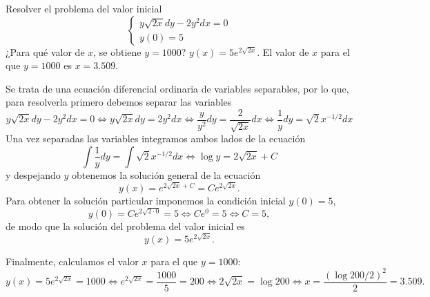 {Resolver el problema del valor inicial
\[
\left\{
  \begin{array}{l}
    y\sqrt{2x}dy-2y^2dx=0\\
    y(0)=5
  \end{array}
\right.
\]
¿Para qué valor de $x$, se obtiene $y=1000$?
}
{$y(x) = 5 e^{2\sqrt{2x}}$. El valor de $x$ para el que $y=1000$ es $x=3.509$.
}
{Se trata de una ecuación diferencial ordinaria de variables separables, por lo que, para resolverla primero debemos separar las variables
\[
y\sqrt{2x}dy-2y^2dx=0 \Leftrightarrow  y\sqrt{2x}dy = 2y^2dx \Leftrightarrow \frac{y}{y^2}dy = \frac{2}{\sqrt{2x}}dx \Leftrightarrow \frac{1}{y}dy = \sqrt{2}x^{-1/2}dx
\]
Una vez separadas las variables integramos ambos lados de la ecuación
\[
\int \frac{1}{y}dy = \int \sqrt{2}x^{-1/2}dx \Leftrightarrow \log y = 2\sqrt{2x} +C
\]
y despejando $y$  obtenemos la solución general de la ecuación
\[
y(x) = e^{2\sqrt{2x}+C} = Ce^{2\sqrt{2x}}.
\]
Para obtener la solución particular imponemos la condición inicial $y(0)=5$,
\[
y(0) = Ce^{2\sqrt{2\cdot 0}} = 5 \Leftrightarrow C e^{0} = 5 \Leftrightarrow C = 5,
\]
de modo que la solución del problema del valor inicial es
\[
y(x) = 5 e^{2\sqrt{2x}}.
\]

Finalmente, calculamos el valor $x$ para el que $y=1000$:
\[
y(x) = 5 e^{2\sqrt{2x}} = 1000 \Leftrightarrow e^{2\sqrt{2x}} = \frac{1000}{5}=200 \Leftrightarrow 2\sqrt{2x} = \log 200 \Leftrightarrow x = \frac{(\log 200/2)^2}{2} = 3.509.
\]
}


